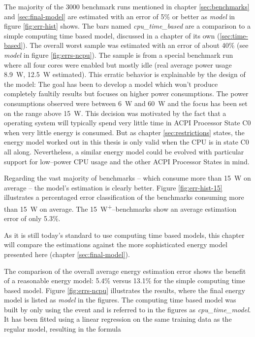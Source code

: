 The majority of the 3000 benchmark runs mentioned in chapter
\ref{sec:benchmarks} and \ref{sec:final-model} are estimated with an error of
5\% or better as \emph{model} in figure \ref{fig:err-hist} shows. The bars named
\emph{cpu\_\-time\_\-based} are a comparison to a simple computing time based
model, discussed in a chapter of its own (\ref{sec:time-based}). The overall
worst sample was estimated with an error of about 40\% (see \emph{model} in
figure \ref{fig:errs-ncpu}). The sample is from a special benchmark run where
all four cores were enabled but mostly idle (real average power usage
\SI{8.9}{\watt}, \SI{12.5}{\watt} estimated). This erratic behavior is
explainable by the design of the model: The goal has been to develop a model
which won't produce completely faultily results but focuses on higher power
consumptions. The power consumptions observed were between \SI{6}{\watt} and
\SI{60}{\watt} and the focus has been set on the range above \SI{15}{\watt}.
This decision was motivated by the fact that a operating system will typically
spend very little time in ACPI Processor State C0 \cite{wiki:ACPI} when very
little energy is consumed. But as chapter \ref{sec:restrictions} states, the
energy model worked out in this thesis is only valid when the CPU is in state C0
all along.  Nevertheless, a similar energy model could be evolved with
particular support for low--power CPU usage and the other ACPI Processor States
in mind.

Regarding the vast majority of benchmarks -- which consume more than
\SI{15}{\watt} on average -- the model's estimation is clearly better. Figure
\ref{fig:err-hist-15} illustrates a percentaged error classification of the
benchmarks consuming more than \SI{15}{\watt} on average. The
\SI{15}{\watt}\textsuperscript{+}--benchmarks show an average estimation error
of only 5.3\%.


\label{sec:time-based}

As it is still today's standard to use computing time based models, this chapter
will compare the estimations against the more sophisticated energy model
presented here (chapter \ref{sec:final-model}).

The comparison of the overall average energy estimation error shows the benefit
of a reasonable energy model: 5.4\% versus 13.1\% for the simple computing time
based model. Figure \ref{fig:errs-ncpu} illustrates the results, where the final
energy model is listed as \emph{model} in the figures. The computing time based
model was built by only using the event  and is
referred to in the figures as \emph{cpu\_\-time\_\-model}. It has been fitted
using a linear regression on the same training data as the regular model,
resulting in the formula

